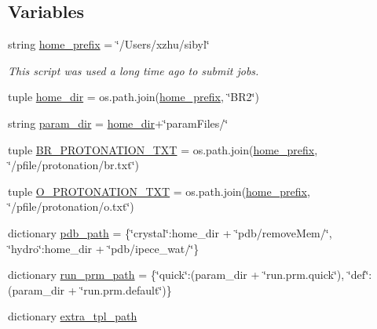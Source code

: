 \subsection*{Variables}
\begin{DoxyCompactItemize}
\item 
string \hyperlink{namespacehydro__s4_a121740595cf79da70a9d532130b2bd22}{home\-\_\-prefix} = \char`\"{}/Users/xzhu/sibyl\char`\"{}
\begin{DoxyCompactList}\small\item\em This script was used a long time ago to submit jobs. \end{DoxyCompactList}\item 
tuple \hyperlink{namespacehydro__s4_aea511fc9c9b2aa6d76edbe787efc805f}{home\-\_\-dir} = os.\-path.\-join(\hyperlink{namespacehydro__s4_a121740595cf79da70a9d532130b2bd22}{home\-\_\-prefix}, \char`\"{}B\-R2\char`\"{})
\item 
string \hyperlink{namespacehydro__s4_a1e650f939d99afbd6f274f51a29f61dd}{param\-\_\-dir} = \hyperlink{namespacehydro__s4_aea511fc9c9b2aa6d76edbe787efc805f}{home\-\_\-dir}+\char`\"{}param\-Files/\char`\"{}
\item 
tuple \hyperlink{namespacehydro__s4_a61fdb7e099159115ed2b24d53567f6fb}{B\-R\-\_\-\-P\-R\-O\-T\-O\-N\-A\-T\-I\-O\-N\-\_\-\-T\-X\-T} = os.\-path.\-join(\hyperlink{namespacehydro__s4_a121740595cf79da70a9d532130b2bd22}{home\-\_\-prefix}, \char`\"{}/pfile/protonation/br.\-txt\char`\"{})
\item 
tuple \hyperlink{namespacehydro__s4_aa770e5ac528dc9451e7938c8c69d7988}{O\-\_\-\-P\-R\-O\-T\-O\-N\-A\-T\-I\-O\-N\-\_\-\-T\-X\-T} = os.\-path.\-join(\hyperlink{namespacehydro__s4_a121740595cf79da70a9d532130b2bd22}{home\-\_\-prefix}, \char`\"{}/pfile/protonation/o.\-txt\char`\"{})
\item 
dictionary \hyperlink{namespacehydro__s4_af11b629eba244d6dc31f27fea817fdbe}{pdb\-\_\-path} = \{\char`\"{}crystal\char`\"{}\-:home\-\_\-dir + \char`\"{}pdb/remove\-Mem/\char`\"{}, \char`\"{}hydro\char`\"{}\-:home\-\_\-dir + \char`\"{}pdb/ipece\-\_\-wat/\char`\"{}\}
\item 
dictionary \hyperlink{namespacehydro__s4_a26ca7150ba62a58db12918a1ce03a6cb}{run\-\_\-prm\-\_\-path} = \{\char`\"{}quick\char`\"{}\-:(param\-\_\-dir + \char`\"{}run.\-prm.\-quick\char`\"{}), \char`\"{}def\char`\"{}\-:(param\-\_\-dir + \char`\"{}run.\-prm.\-default\char`\"{})\}
\item 
dictionary \hyperlink{namespacehydro__s4_a2afd7863dc3627b4c2aa6bed8f4c863e}{extra\-\_\-tpl\-\_\-path}

\end{DoxyCompactItemize}
